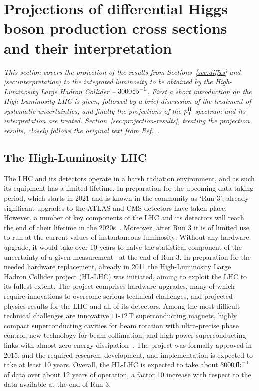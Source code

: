 \section{Projections of differential Higgs boson production cross sections and their interpretation}

\emph{%
This section covers the projection of the results from Sections~\ref{sec:diffxs} and \ref{sec:interpretation} to the integrated luminosity to be obtained by the High-Luminosity Large Hadron Collider -- $3000\,\text{fb}^{-1}$.
% 
First a short introduction on the High-Luminosity LHC is given, followed by a brief discussion of the treatment of systematic uncertainties, and finally the projections of the $p_\mathrm{T}^\mathrm{H}$ spectrum and its interpretation are treated.
% 
Section~\ref{sec:projection-results}, treating the projection results, closely follows the original text from Ref.~\cite{CMS:2018qgz}.
}


\subsection{The High-Luminosity LHC}

The LHC and its detectors operate in a harsh radiation environment, and as such its equipment has a limited lifetime.
% 
In preparation for the upcoming data-taking period, which starts in 2021 and is known in the community as `Run 3', already significant upgrades to the ATLAS and CMS detectors have taken place.
% 
However, a number of key components of the LHC and its detectors will reach the end of their lifetime in the 2020s~\cite{hllhc}.
% 
Moreover, after Run 3 it is of limited use to run at the current values of instantaneous luminosity: Without any hardware upgrade, it would take over 10 years to halve the statistical component of the uncertainty of a given measurement~\cite{hllhc} at the end of Run 3.
% 
In preparation for the needed hardware replacement, already in 2011 the High-Luminosity Large Hadron Collider project (HL-LHC) was initiated, aiming to exploit the LHC to its fullest extent.
% 
The project comprises hardware upgrades, many of which require innovations to overcome serious technical challenges, and projected physics results for the LHC and all of its detectors.
% 
Among the most difficult technical challenges are innovative $11$-$12\,$T superconducting magnets, highly compact superconducting cavities for beam rotation with ultra-precise phase control, new technology for beam collimation, and high-power superconducting links with almost zero energy dissipation~\cite{hllhc}.
% 
The project was formally approved in 2015, and the required research, development, and implementation is expected to take at least 10 years.
% 
Overall, the HL-LHC is expected to take about $3000\,\text{fb}^{-1}$ of data over about 12 years of operation, a factor 10 increase with respect to the data available at the end of Run 3.


